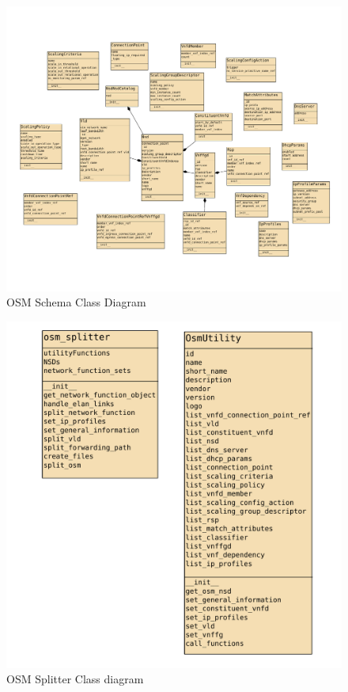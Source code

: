 \begin{figure}
	\centering
	\includegraphics[width=1\linewidth]{../figures/osm-schema}
	\caption{OSM Schema Class Diagram}
	\label{fig:osmschemaclassdiagram}
\end{figure}

\begin{figure}
	\centering
	\includegraphics[width=1\linewidth]{../figures/OSM-Splitter}
	\caption{OSM Splitter Class diagram}
	\label{fig:osmsplitterclassdiagram}
\end{figure}

